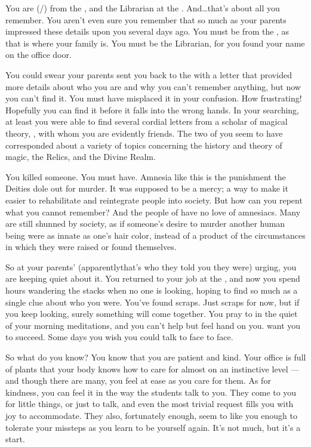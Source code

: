 \documentclass[char]{GL2020}
\begin{document}
\name{\cLibrarian{}}

You are \cLibrarian{\full} (\cLibrarian{\they}/\cLibrarian{\them}) from the \pTech{}, and the Librarian at the \pSchool{}. And\ldots that's about all you remember. You aren't even sure you remember that so much as your parents impressed these details upon you several days ago. You must be from the \pTech{}, as that is where your family is. You must be the Librarian, for you found your name on the office door. 

You could swear your parents sent you back to the \pSchool{} with a letter that provided more details about who you are and why you can’t remember anything, but now you can’t find it. You must have misplaced it in your confusion. How frustrating! Hopefully you can find it before it falls into the wrong hands. In your searching, at least you were able to find several cordial letters from a scholar of magical theory, \cWildCard{\full}, with whom you are evidently friends. The two of you seem to have corresponded about a variety of topics concerning the history and theory of magic, the Relics, and the Divine Realm.

You killed someone. You must have. Amnesia like this is the punishment the Deities dole out for murder. It was supposed to be a mercy; a way to make it easier to rehabilitate and reintegrate people into society. But how can you repent what you cannot remember? And the people of \pEarth{} have no love of amnesiacs. Many are still shunned by society, as if someone's desire to murder another human being were as innate as one's hair color, instead of a product of the circumstances in which they were raised or found themselves.

So at your parents’ (apparently\Idots that’s who they told you they were) urging, you are keeping quiet about it. You returned to your job at the \pSchool{}, and now you spend hours wandering the stacks when no one is looking, hoping to find so much as a single clue about who you were. You've found scraps. Just scraps for now, but if you keep looking, surely something will come together. You pray to \cTechGod{} in the quiet of your morning meditations, and you can't help but feel \cTechGod{\their} hand on you. \cTechGod{\They} want you to succeed. Some days you wish you could talk to \cTechGod{\them} face to face.

So what do you know? You know that you are patient and kind. Your office is full of plants that your body knows how to care for almost on an instinctive level — and though there are many, you feel at ease as you care for them. As for kindness, you can feel it in the way the students talk to you. They come to you for little things, or just to talk, and even the most trivial request fills you with joy to accommodate. They also, fortunately enough, seem to like you enough to tolerate your missteps as you learn to be yourself again. It's not much, but it's a start.
\end{document}
